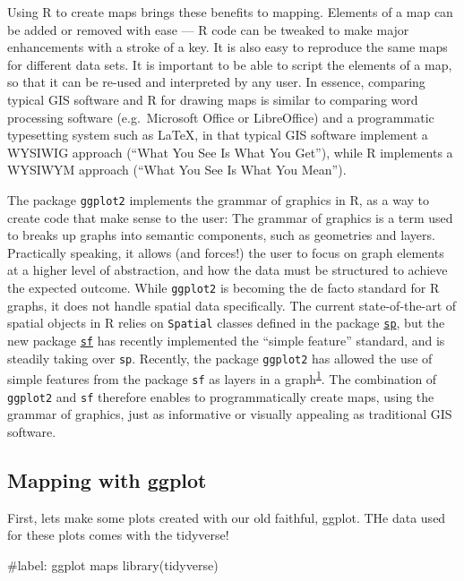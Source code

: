 \documentclass[
  letterpaper,
  DIV=11,
  numbers=noendperiod]{scrartcl}
\newenvironment{Shaded}{\begin{snugshade}}{\end{snugshade}}
\newcommand{\CommentTok}[1]{\textcolor[rgb]{0.37,0.37,0.37}{#1}}
\newcommand{\FunctionTok}[1]{\textcolor[rgb]{0.28,0.35,0.67}{#1}}
\newcommand{\NormalTok}[1]{\textcolor[rgb]{0.00,0.23,0.31}{#1}}
\begin{document}
Using R to create maps brings these benefits to mapping. Elements of a
map can be added or removed with ease --- R code can be tweaked to make
major enhancements with a stroke of a key. It is also easy to reproduce
the same maps for different data sets. It is important to be able to
script the elements of a map, so that it can be re-used and interpreted
by any user. In essence, comparing typical GIS software and R for
drawing maps is similar to comparing word processing software
(e.g.~Microsoft Office or LibreOffice) and a programmatic typesetting
system such as LaTeX, in that typical GIS software implement a WYSIWIG
approach (``What You See Is What You Get''), while R implements a
WYSIWYM approach (``What You See Is What You Mean'').

The package \texttt{ggplot2} implements the grammar of graphics in R, as
a way to create code that make sense to the user: The grammar of
graphics is a term used to breaks up graphs into semantic components,
such as geometries and layers. Practically speaking, it allows (and
forces!) the user to focus on graph elements at a higher level of
abstraction, and how the data must be structured to achieve the expected
outcome. While \texttt{ggplot2} is becoming the de facto standard for R
graphs, it does not handle spatial data specifically. The current
state-of-the-art of spatial objects in R relies on \texttt{Spatial}
classes defined in the package
\href{https://cran.r-project.org/package=sp}{\texttt{sp}}, but the new
package \href{https://cran.r-project.org/package=sf}{\texttt{sf}} has
recently implemented the ``simple feature'' standard, and is steadily
taking over \texttt{sp}. Recently, the package \texttt{ggplot2} has
allowed the use of simple features from the package \texttt{sf} as
layers in a
graph\textsuperscript{\href{https://r-spatial.org/r/2018/10/25/ggplot2-sf.html\#fn:1}{1}}.
The combination of \texttt{ggplot2} and \texttt{sf} therefore enables to
programmatically create maps, using the grammar of graphics, just as
informative or visually appealing as traditional GIS software.

\hypertarget{mapping-with-ggplot}{%
\subsection{Mapping with ggplot}\label{mapping-with-ggplot}}

First, lets make some plots created with our old faithful, ggplot. THe
data used for these plots comes with the tidyverse!

\begin{Shaded}
\begin{Highlighting}[]
\CommentTok{\#\textquotesingle{}label: ggplot maps}
\FunctionTok{library}\NormalTok{(tidyverse)}
\end{Highlighting}
\end{Shaded}
\end{document}
